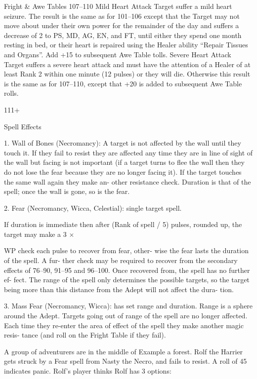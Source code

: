 \begin{Chapter}{Fright \& Awe Tables}
107–110   Mild Heart Attack Target suffer a mild heart seizure. The result 
is the same as for 101–106 except that the Target may not move 
about under their own power for the remainder of the day and 
suffers a decrease of 2 to PS, MD, AG, EN, and FT, until either 
they spend one month resting in bed, or their heart is repaired 
using the Healer ability “Repair Tissues and Organs”. Add +15 to 
subsequent Awe Table tolls. 
Severe Heart Attack Target suffers a severe heart attack and 
must have the attention of a Healer of at least Rank 2 within one 
minute (12 pulses) or they will die. Otherwise this result is the 
same as for 107–110, except that +20 is added to subsequent Awe 
Table rolls. 

111+  

Spell Effects 

1.  Wall  of  Bones  (Necromancy):  A  target  is  not 
affected by the wall until they touch it. If they fail 
to resist they are affected any time they are in line 
of sight of the wall but facing is not important (if a 
target  turns  to  flee  the  wall  then  they  do  not  lose 
the fear because they are no longer facing it). If the 
target  touches  the  same  wall  again  they  make  an-
other resistance check. Duration is that of the spell; 
once the wall is gone, so is the fear. 

2.  Fear  (Necromancy,  Wicca,  Celestial):  single 
target spell. 

If duration is immediate then after (Rank of spell / 
5)  pulses,  rounded  up,  the  target  may  make  a  3  × 
 

 

WP  check  each  pulse  to  recover  from  fear,  other-
wise the fear lasts the duration of the spell.  A fur-
ther  check  may  be  required  to  recover  from  the 
secondary  effects  of  76–90,  91–95  and  96–100. 
Once  recovered  from,  the  spell  has  no  further  ef-
fect.  The  range  of  the  spell  only  determines  the 
possible targets, so the target being more than this 
distance  from  the  Adept  will  not  affect  the  dura-
tion. 

3.  Mass  Fear  (Necromancy,  Wicca):  has  set  range 
and duration. Range is a sphere around the Adept. 
Targets  going  out  of  range  of  the  spell  are  no 
longer affected. Each time they re-enter the area of 
effect  of  the  spell  they  make  another  magic  resis-
tance (and roll on the Fright Table if they fail). 

A group of adventurers are in the middle of 
Example 
a  forest. Rolf the  Harrier  gets struck by a  Fear spell  from 
Nasty the Necro, and  fails to  resist.  A roll of 45  indicates 
panic. Rolf’s player thinks Rolf has 3 options: 


\end{Chapter}
